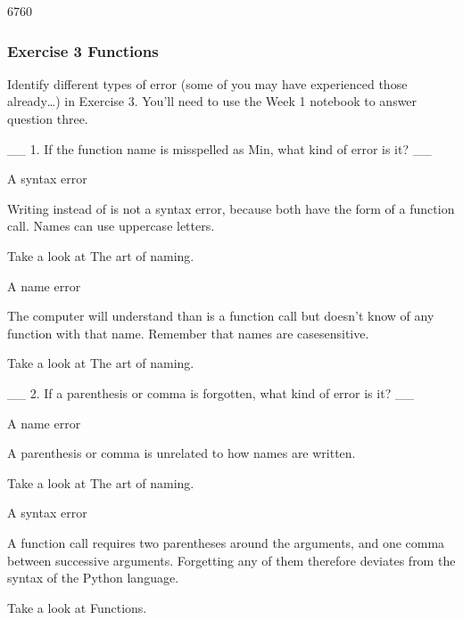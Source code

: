 \documentclass[letterpaper,10pt,english]{sphinxmanual}
\begin{document}

{
\begin{sphinxVerbatim}[commandchars=\\\{\}]
\llap{\color{nbsphinxin}[ ]:\,\hspace{\fboxrule}\hspace{\fboxsep}}
6760
\end{sphinxVerbatim}
}


\subsubsection{Exercise 3 Functions}
\label{\detokenize{content/session_01/Part_01_02:Exercise-3-Functions}}
Identify different types of error (some of you may have experienced those already…) in Exercise 3. You’ll need to use the Week 1 notebook to answer question three.

\_\_ 1. If the function name is misspelled as Min, what kind of error is it? \_\_

A syntax error

Writing  instead of  is not a syntax error, because both have the form of a function call. Names can use uppercase letters.

Take a look at The art of naming.

A name error

The computer will understand than  is a function call but doesn’t know of any function with that name. Remember that names are case\sphinxhyphen{}sensitive.

Take a look at The art of naming.

\_\_ 2. If a parenthesis or comma is forgotten, what kind of error is it? \_\_

A name error

A parenthesis or comma is unrelated to how names are written.

Take a look at The art of naming.

A syntax error

A function call requires two parentheses around the arguments, and one comma between successive arguments. Forgetting any of them therefore deviates from the syntax of the Python language.

Take a look at Functions.
\end{document}

